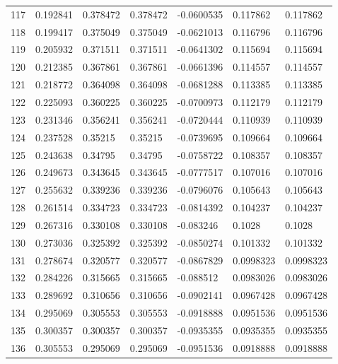 \begin{longtable}{l|lll|lll}
 117 &  0.192841    & 0.378472    & 0.378472    & -0.0600535   & 0.117862    & 0.117862    \\
 118 &  0.199417    & 0.375049    & 0.375049    & -0.0621013   & 0.116796    & 0.116796    \\
 119 &  0.205932    & 0.371511    & 0.371511    & -0.0641302   & 0.115694    & 0.115694    \\
 120 &  0.212385    & 0.367861    & 0.367861    & -0.0661396   & 0.114557    & 0.114557    \\
 121 &  0.218772    & 0.364098    & 0.364098    & -0.0681288   & 0.113385    & 0.113385    \\
 122 &  0.225093    & 0.360225    & 0.360225    & -0.0700973   & 0.112179    & 0.112179    \\
 123 &  0.231346    & 0.356241    & 0.356241    & -0.0720444   & 0.110939    & 0.110939    \\
 124 &  0.237528    & 0.35215     & 0.35215     & -0.0739695   & 0.109664    & 0.109664    \\
 125 &  0.243638    & 0.34795     & 0.34795     & -0.0758722   & 0.108357    & 0.108357    \\
 126 &  0.249673    & 0.343645    & 0.343645    & -0.0777517   & 0.107016    & 0.107016    \\
 127 &  0.255632    & 0.339236    & 0.339236    & -0.0796076   & 0.105643    & 0.105643    \\
 128 &  0.261514    & 0.334723    & 0.334723    & -0.0814392   & 0.104237    & 0.104237    \\
 129 &  0.267316    & 0.330108    & 0.330108    & -0.083246    & 0.1028      & 0.1028      \\
 130 &  0.273036    & 0.325392    & 0.325392    & -0.0850274   & 0.101332    & 0.101332    \\
 131 &  0.278674    & 0.320577    & 0.320577    & -0.0867829   & 0.0998323   & 0.0998323   \\
 132 &  0.284226    & 0.315665    & 0.315665    & -0.088512    & 0.0983026   & 0.0983026   \\
 133 &  0.289692    & 0.310656    & 0.310656    & -0.0902141   & 0.0967428   & 0.0967428   \\
 134 &  0.295069    & 0.305553    & 0.305553    & -0.0918888   & 0.0951536   & 0.0951536   \\
 135 &  0.300357    & 0.300357    & 0.300357    & -0.0935355   & 0.0935355   & 0.0935355   \\
 136 &  0.305553    & 0.295069    & 0.295069    & -0.0951536   & 0.0918888   & 0.0918888   \\

\end{longtable}
